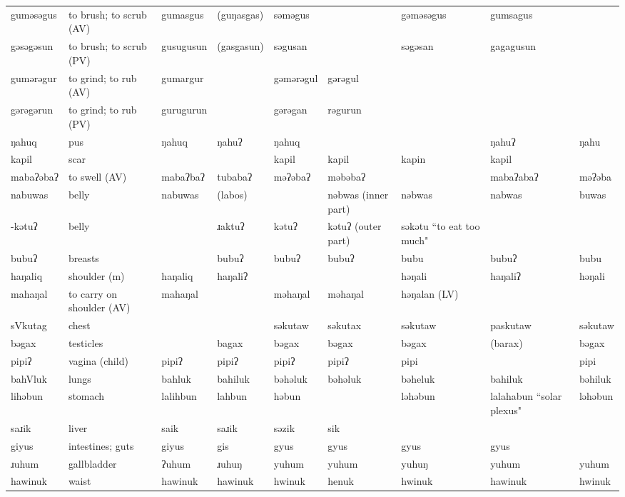 \begin{landscape}
\begin{longtable}{*{9}{p{}}}
\text{*}guməsəgus & to brush; to scrub (AV) & gumasgus & (guŋasgas) & səməgus &  & gəməsəgus & gumsagus & \\
\text{*}gəsəgəsun & to brush; to scrub (PV) & gusugusun & (gasgasun) & səgusan &  & səgəsan & gagagusun & \\
\text{*}gumərəgur & to grind; to rub (AV) & gumargur &  & gəmərəgul & gərəgul &  &  & \\
\text{*}gərəgərun & to grind; to rub (PV) & gurugurun &  & gərəgan & rəgurun &  &  & \\
\text{*}ŋahuq & pus & ŋahuq & ŋahuʔ & ŋahuq &  &  & ŋahuʔ & ŋahu\\
\text{*}kapil & scar &  &  & kapil & kapil & kapin & kapil & \\
\text{*}mabaʔəbaʔ & to swell (AV) & mabaʔbaʔ & tubabaʔ & məʔəbaʔ & məbəbaʔ &  & mabaʔabaʔ & məʔəba\\
\text{*}nabuwas & belly & nabuwas & (labos) &  & nəbwas (inner part) & nəbwas & nabwas & buwas\\
\text{*}-kətuʔ & belly &  & ɹaktuʔ & kətuʔ & kətuʔ (outer part) & səkətu ``to eat too much" &  & \\
\text{*}bubuʔ & breasts &  & bubuʔ & bubuʔ & bubuʔ & bubu & bubuʔ & bubu\\
\text{*}haŋaliq & shoulder (m) & haŋaliq & haŋaliʔ &  &  & həŋali & haŋaliʔ & həŋali\\
\text{*}mahaŋal & to carry on shoulder (AV) & mahaŋal &  & məhaŋal & məhaŋal & həŋalan (LV) &  & \\
\text{*}sVkutag & chest &  &  & səkutaw & səkutax & səkutaw & paskutaw & səkutaw\\
\text{*}bəgax & testicles &  & bagax & bəgax & bəgax & bəgax & (barax) & bəgax\\
\text{*}pipiʔ & vagina (child) & pipiʔ & pipiʔ & pipiʔ & pipiʔ & pipi &  & pipi\\
\text{*}bahVluk & lungs & bahluk & bahiluk & bəhəluk & bəhəluk & bəheluk & bahiluk & bəhiluk\\
\text{*}lihəbun & stomach & lalihbun & lahbun & həbun &  & ləhəbun & lalahabun ``solar plexus" & ləhəbun\\
\text{*}saɹik & liver & saik & saɹik & səzik & sik &  &  & \\
\text{*}giyus & intestines; guts & giyus & gis & gyus & gyus & gyus & gyus & \\
\text{*}ɹuhum & gallbladder & ʔuhum & ɹuhuŋ & yuhum & yuhum & yuhuŋ & yuhum & yuhum\\
\text{*}hawinuk & waist & hawinuk & hawinuk & hwinuk & henuk & hwinuk & hawinuk & hwinuk\\

\end{longtable}
\end{landscape}
